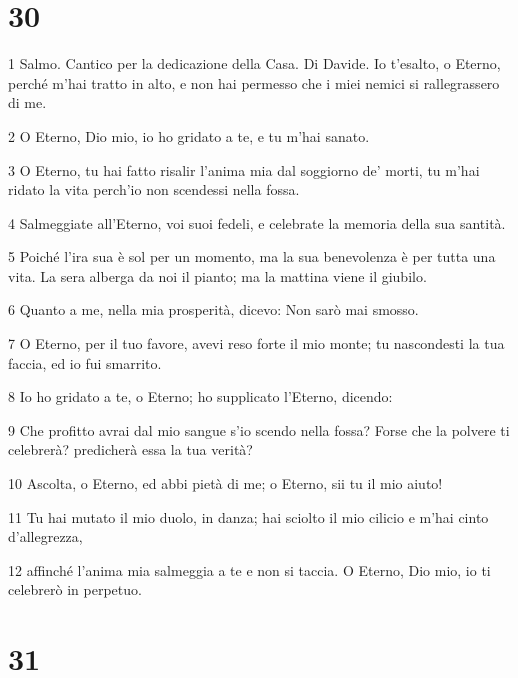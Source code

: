 \chapter{30}

\par 1 Salmo. Cantico per la dedicazione della Casa. Di Davide. Io t'esalto, o Eterno, perché m'hai tratto in alto, e non hai permesso che i miei nemici si rallegrassero di me.
\par 2 O Eterno, Dio mio, io ho gridato a te, e tu m'hai sanato.
\par 3 O Eterno, tu hai fatto risalir l'anima mia dal soggiorno de' morti, tu m'hai ridato la vita perch'io non scendessi nella fossa.
\par 4 Salmeggiate all'Eterno, voi suoi fedeli, e celebrate la memoria della sua santità.
\par 5 Poiché l'ira sua è sol per un momento, ma la sua benevolenza è per tutta una vita. La sera alberga da noi il pianto; ma la mattina viene il giubilo.
\par 6 Quanto a me, nella mia prosperità, dicevo: Non sarò mai smosso.
\par 7 O Eterno, per il tuo favore, avevi reso forte il mio monte; tu nascondesti la tua faccia, ed io fui smarrito.
\par 8 Io ho gridato a te, o Eterno; ho supplicato l'Eterno, dicendo:
\par 9 Che profitto avrai dal mio sangue s'io scendo nella fossa? Forse che la polvere ti celebrerà? predicherà essa la tua verità?
\par 10 Ascolta, o Eterno, ed abbi pietà di me; o Eterno, sii tu il mio aiuto!
\par 11 Tu hai mutato il mio duolo, in danza; hai sciolto il mio cilicio e m'hai cinto d'allegrezza,
\par 12 affinché l'anima mia salmeggia a te e non si taccia. O Eterno, Dio mio, io ti celebrerò in perpetuo.

\chapter{31}

